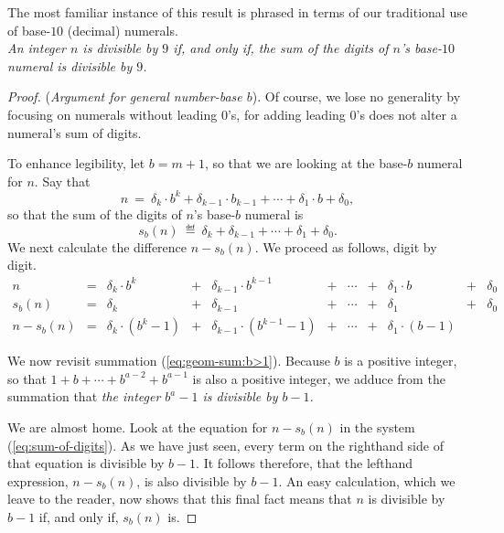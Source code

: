 The most familiar instance of this result is phrased in terms of our
traditional use of base-$10$ (decimal) numerals. \\
{\it An integer $n$ is divisible by $9$ if, and only if, the sum of
  the digits of $n$'s base-$10$ numeral is divisible by $9$.}

\smallskip

\begin{proof}
({\it Argument for general number-base $b$}).
%
Of course, we lose no generality by focusing on numerals without
leading $0$'s, for adding leading $0$'s does not alter a numeral's sum
of digits.

To enhance legibility, let $b = m+1$, so that we are looking at the
base-$b$ numeral for $n$.  Say that
\[ n \ = \ \delta_k \cdot b^k + \delta_{k-1} \cdot b_{k-1} + \cdots +
\delta_1 \cdot b + \delta_0, \]
so that the sum of the digits of $n$'s base-$b$ numeral is
\[ s_b(n) \ \eqdef \ \delta_k + \delta_{k-1} + \cdots + \delta_1 + \delta_0. \]
We next calculate the difference $n - s_b(n)$.  We proceed as
follows, digit by digit.
\begin{equation}
\label{eq:sum-of-digits}
\begin{array}{ccccccccccc}
n & = &
\delta_k \cdot b^k & + & \delta_{k-1} \cdot b^{k-1} & + & \cdots
  & + & \delta_1 \cdot b & + & \delta_0 \\
s_b(n) & = &
\delta_k & + & \delta_{k-1} & + & \cdots & + & \delta_1 & + & \delta_0 \\
\hline
n - s_b(n) & = &
\delta_k \cdot (b^k -1) & + &
\delta_{k-1} \cdot (b^{k-1} -1) & + &
\cdots & + &
\delta_1 \cdot (b-1) & & 
\end{array}
\end{equation}

We now revisit summation (\ref{eq:geom-sum:b>1}).  Because $b$ is a
positive integer, so that $1 + b + \cdots + b^{a-2} + b^{a-1}$ is also
a positive integer, we adduce from the summation that {\em the integer
  $b^a -1$ is divisible by $b-1$.}

We are almost home.  Look at the equation for $n - s_b(n)$ in the
system (\ref{eq:sum-of-digits}).  As we have just seen, every term on
the righthand side of that equation is divisible by $b-1$.  It follows
therefore, that the lefthand expression, $n - s_b(n)$, is also
divisible by $b-1$.  An easy calculation, which we leave to the
reader, now shows that this final fact means that $n$ is divisible by
$b-1$ if, and only if, $s_b(n)$ is.
\end{proof}

